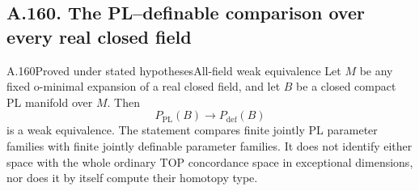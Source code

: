\subsection{A.160. The PL--definable comparison over every real closed field}

\begin{saresult}{A.160}{Proved under stated hypotheses}{All-field weak equivalence}
Let $M$ be any fixed o-minimal expansion of a real closed field,
and let $B$ be a closed compact PL manifold over $M$. Then
\[
 P_{\mathrm{PL}}(B)\longrightarrow P_{\mathrm{def}}(B)
 \tag{160.1}
\]
is a weak equivalence. The statement compares finite jointly
PL parameter families with finite jointly definable parameter
families. It does not identify either space with the whole
ordinary TOP concordance space in exceptional dimensions,
nor does it by itself compute their homotopy type.
\end{saresult}

